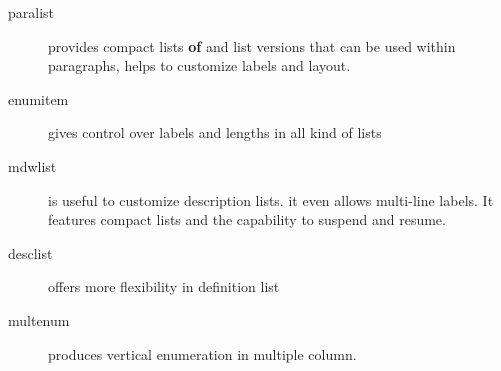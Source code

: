 \documentclass{article}
\begin{document}
\listdiagram
\begin{description}
	\item[paralist] provides compact lists \textbf{of} and list versions that can be used within paragraphs, helps to customize labels and layout.
	\item[enumitem] gives control over labels and lengths in all kind of lists
	\item[mdwlist] is useful to customize description lists. it even allows multi-line labels. It features compact lists and the capability to suspend and resume.
	\item[desclist] offers more flexibility in definition list
	\item[multenum] produces vertical enumeration in multiple column.
\end{description}
\end{document}
